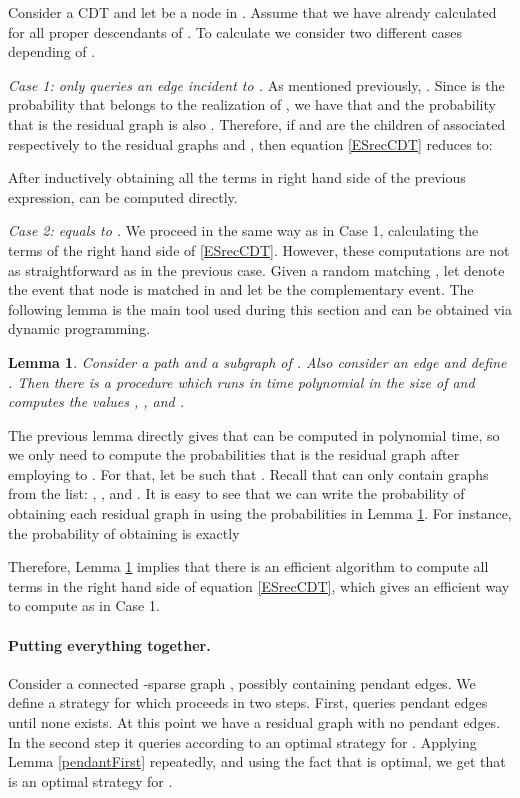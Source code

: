 \documentclass[12pt]{article}
\newtheorem{lemma}{Lemma}
\begin{document}
		Consider a CDT  and let  be a node in . Assume that we have already calculated  for all proper descendants  of . To calculate  we consider two different cases depending of . 
		
		\medskip \noindent \emph{Case 1:  only queries an edge  incident to .} As mentioned previously, . Since  is the probability that  belongs to the realization of , we have that  and the probability that  is the residual graph is also . Therefore, if  and  are the children of  associated respectively to the residual graphs  and , then equation \eqref{ESrecCDT} reduces to:

		After inductively obtaining all the terms in right hand side of the previous expression,  can be computed directly.
		
		\medskip \noindent \emph{Case 2:  equals to .} We proceed in the same way as in Case 1, calculating the terms of the right hand side of \eqref{ESrecCDT}. However, these computations are not as straightforward as in the previous case. Given a random matching , let  denote the event that node  is matched in  and let  be the complementary event. The following lemma is the main tool used during this section and can be obtained via dynamic programming.
		
		\begin{lemma} \label{valueSPi}
			Consider a path  and a subgraph  of . Also consider an edge  and define . Then there is a procedure which runs in time polynomial in the size of  and computes the values , ,  and .
		\end{lemma}
		
		The previous lemma directly gives that  can be computed in polynomial time, so we only need to compute the probabilities that  is the residual graph after employing  to . For that, let  be such that . Recall that  can only contain graphs from the list: , ,  and . It is easy to see that we can write the probability of obtaining each residual graph in  using the probabilities in Lemma \ref{valueSPi}. For instance, the probability of obtaining  is exactly 

		
		Therefore, Lemma \ref{valueSPi} implies that there is an efficient algorithm to compute all terms in the right hand side of equation \eqref{ESrecCDT}, which gives an efficient way to compute  as in Case 1. 
		
	\paragraph{Putting everything together.} Consider a connected -sparse graph , possibly containing pendant edges. We define a strategy  for  which proceeds in two steps. First,  queries pendant edges until none exists. At this point we have a residual graph  with no pendant edges. In the second step it queries according to an optimal strategy  for . Applying Lemma \ref{pendantFirst} repeatedly, and using the fact that  is optimal, we get that  is an optimal strategy for .
	
\end{document}
